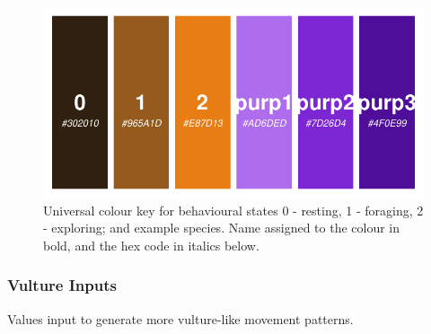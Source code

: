 \documentclass[10pt,a4paper]{article}
\begin{document}
\begin{figure}

{\centering \includegraphics{Agent-based_model_walkthrough_files/figure-latex/palettePreview-1} 

}

\caption{Universal colour key for behavioural states 0 - resting, 1 - foraging, 2 - exploring; and example species. Name assigned to the colour in bold, and the hex code in italics below.}\label{fig:palettePreview}
\end{figure}

\hypertarget{vulture-inputs}{%
\subsubsection{Vulture Inputs}\label{vulture-inputs}}

Values input to generate more vulture-like movement patterns.
\end{document}
